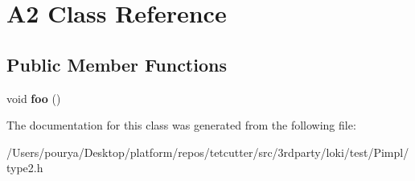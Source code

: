 \hypertarget{classA2}{}\section{A2 Class Reference}
\label{classA2}
\subsection*{Public Member Functions}
\begin{DoxyCompactItemize}
\item 
\hypertarget{classA2_a37da4a0f557a7bbed81daeb0a7dd1948}{}void {\bfseries foo} ()\label{classA2_a37da4a0f557a7bbed81daeb0a7dd1948}

\end{DoxyCompactItemize}


The documentation for this class was generated from the following file\+:\begin{DoxyCompactItemize}
\item 
/\+Users/pourya/\+Desktop/platform/repos/tetcutter/src/3rdparty/loki/test/\+Pimpl/type2.\+h\end{DoxyCompactItemize}
